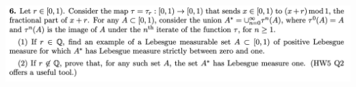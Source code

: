 \newpage
\begin{mdframed}
  \includegraphics[width=400pt]{img/analysis--berkeley-202a-hw06-9bc5.png}
\end{mdframed}








